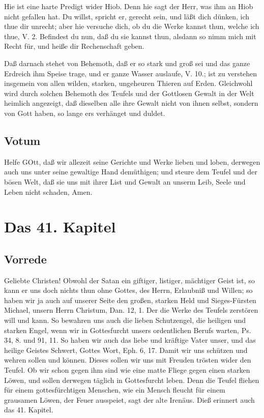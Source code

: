 Hie ist eine harte Predigt wider Hiob. Denn hie sagt der Herr, was ihm an Hiob nicht gefallen hat. Du willst, spricht er, gerecht sein, und läßt dich dünken, ich thue dir unrecht; aber hie versuche dich, ob du die Werke kannst thun, welche ich thue, V. 2. Befindest du nun, daß du sie kannst thun, alsdann so nimm mich mit Recht für, und heiße dir Rechenschaft geben.

Daß darnach stehet von Behemoth, daß er so stark und groß sei und das ganze Erdreich ihm Speise trage, und er ganze Wasser auslaufe, V. 10.; ist zu verstehen insgemein von allen wilden, starken, ungeheuren Thieren auf Erden. Gleichwohl wird durch solchen Behemoth des Teufels und der Gottlosen Gewalt in der Welt heimlich angezeigt, daß dieselben alle ihre Gewalt nicht von ihnen selbst, sondern von Gott haben, so lange ers verhänget und duldet.

\section{Votum}

Helfe GOtt, daß wir allezeit seine Gerichte und Werke lieben und loben, derwegen auch uns unter seine gewaltige Hand demüthigen; und steure dem Teufel und der bösen Welt, daß sie uns mit ihrer List und Gewalt an unserm Leib, Seele und Leben nicht schaden, Amen.

\chapter{Das 41. Kapitel}

\section{Vorrede}

Geliebte Christen! Obwohl der Satan ein giftiger, listiger, mächtiger Geist ist, so kann er uns doch nichts thun ohne Gottes, des Herrn, Erlaubniß und Willen; so haben wir ja auch auf unserer Seite den großen, starken Held und Sieges-Fürsten Michael, unsern Herrn Christum, Dan. 12, 1. Der die Werke des Teufels zerstören will und kann. So bewahren uns auch die lieben Schutzengel, die heiligen und starken Engel, wenn wir in Gottesfurcht unsers ordentlichen Berufs warten, Ps. 34, 8. und 91, 11. So haben wir auch das liebe und kräftige Vater unser, und das heilige Geistes Schwert, Gottes Wort, Eph. 6, 17. Damit wir uns schützen und wehren sollen und können. Dieses sollen wir uns mit Freuden trösten wider den Teufel. Ob wir schon gegen ihm sind wie eine matte Fliege gegen einen starken Löwen, und sollen derwegen täglich in Gottesfurcht leben. Denn die Teufel fliehen für einem gottesfürchtigen Menschen, wie ein Mensch fleucht für einem grausamen Löwen, der Feuer ausspeiet, sagt der alte Irenäus. Dieß erinnert auch das 41. Kapitel.

